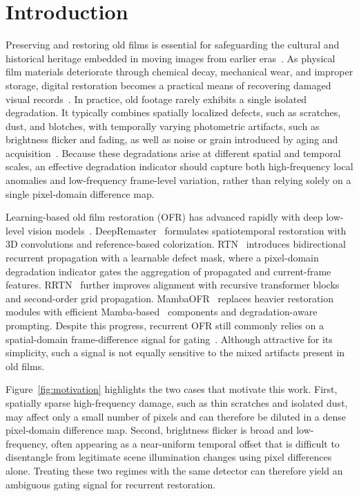 \documentclass[applsci,article,submit,pdftex,moreauthors]{Definitions/mdpi}
\begin{document}
\section{Introduction}\label{sec:introduction}

Preserving and restoring old films is essential for safeguarding the cultural and historical heritage embedded in moving images from earlier eras~\cite{kokaram1998motion}. As physical film materials deteriorate through chemical decay, mechanical wear, and improper storage, digital restoration becomes a practical means of recovering damaged visual records~\cite{iizuka2019deepremaster}. In practice, old footage rarely exhibits a single isolated degradation. It typically combines spatially localized defects, such as scratches, dust, and blotches, with temporally varying photometric artifacts, such as brightness flicker and fading, as well as noise or grain introduced by aging and acquisition~\cite{rtn2022,wan2020bringing}. Because these degradations arise at different spatial and temporal scales, an effective degradation indicator should capture both high-frequency local anomalies and low-frequency frame-level variation, rather than relying solely on a single pixel-domain difference map.

Learning-based old film restoration (OFR) has advanced rapidly with deep low-level vision models~\cite{su2022survey,tian2020deep_denoising}. DeepRemaster~\cite{iizuka2019deepremaster} formulates spatiotemporal restoration with 3D convolutions and reference-based colorization. RTN~\cite{rtn2022} introduces bidirectional recurrent propagation with a learnable defect mask, where a pixel-domain degradation indicator gates the aggregation of propagated and current-frame features. RRTN~\cite{rrtn2024} further improves alignment with recursive transformer blocks and second-order grid propagation. MambaOFR~\cite{mao2025mambaofr} replaces heavier restoration modules with efficient Mamba-based~\cite{guo2024mambair} components and degradation-aware prompting. Despite this progress, recurrent OFR still commonly relies on a spatial-domain frame-difference signal for gating~\cite{rtn2022}. Although attractive for its simplicity, such a signal is not equally sensitive to the mixed artifacts present in old films.

Figure~\ref{fig:motivation} highlights the two cases that motivate this work. First, spatially sparse high-frequency damage, such as thin scratches and isolated dust, may affect only a small number of pixels and can therefore be diluted in a dense pixel-domain difference map. Second, brightness flicker is broad and low-frequency, often appearing as a near-uniform temporal offset that is difficult to disentangle from legitimate scene illumination changes using pixel differences alone. Treating these two regimes with the same detector can therefore yield an ambiguous gating signal for recurrent restoration.
\end{document}
